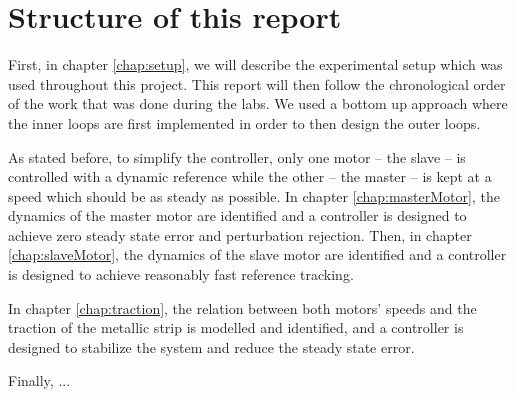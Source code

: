 \section{Structure of this report}
First, in chapter \ref{chap:setup}, we will describe the experimental setup which was used throughout this project. This report will then follow the chronological order of the work that was done during the labs. We used a bottom up approach where the inner loops are first implemented in order to then design the outer loops.

As stated before, to simplify the controller, only one motor -- the slave -- is controlled with a dynamic reference while the other -- the master -- is kept at a speed which should be as steady as possible. In chapter \ref{chap:masterMotor}, the dynamics of the master motor are identified and a controller is designed to achieve zero steady state error and perturbation rejection. Then, in chapter \ref{chap:slaveMotor}, the dynamics of the slave motor are identified and a controller is designed to achieve reasonably fast reference tracking.

In chapter \ref{chap:traction}, the relation between both motors' speeds and the traction of the metallic strip is modelled and identified, and a controller is designed to stabilize the system and reduce the steady state error.

Finally, ... 

